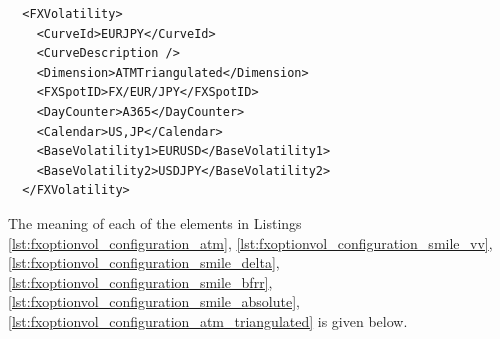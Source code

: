 \begin{longlisting}
\begin{verbatim}
  <FXVolatility>
    <CurveId>EURJPY</CurveId>
    <CurveDescription />
    <Dimension>ATMTriangulated</Dimension>
    <FXSpotID>FX/EUR/JPY</FXSpotID>
    <DayCounter>A365</DayCounter>
    <Calendar>US,JP</Calendar>
    <BaseVolatility1>EURUSD</BaseVolatility1>
    <BaseVolatility2>USDJPY</BaseVolatility2>
  </FXVolatility>
\end{verbatim}
\caption{FX option volatility configuration ATM Triangulated}
\label{lst:fxoptionvol_configuration_atm_triangulated}
\end{longlisting}

The meaning of each of the elements in Listings \ref{lst:fxoptionvol_configuration_atm},
\ref{lst:fxoptionvol_configuration_smile_vv}, \ref{lst:fxoptionvol_configuration_smile_delta},
\ref{lst:fxoptionvol_configuration_smile_bfrr}, \ref{lst:fxoptionvol_configuration_smile_absolute}, \ref{lst:fxoptionvol_configuration_atm_triangulated} is given below.

